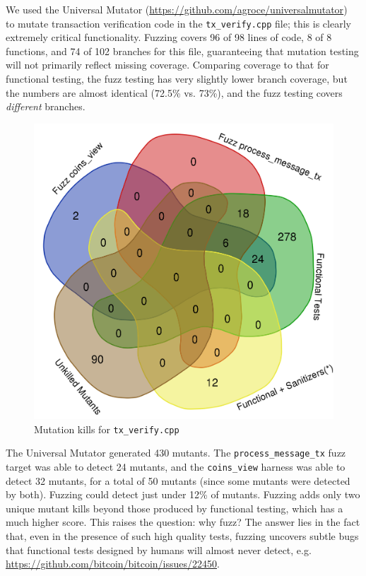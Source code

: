 \begin{sloppypar}
We used the Universal Mutator
\noindent(\url{https://github.com/agroce/universalmutator})~\cite{regexpMut} to
mutate transaction
verification code  in the
{\tt tx\_verify.cpp} file; this is clearly extremely critical functionality.  Fuzzing covers 96 of 98 lines of code, 8
of 8 functions, and 74 of 102 branches for this file, guaranteeing
that mutation testing will not primarily reflect missing coverage.
Comparing coverage to that for functional testing, the fuzz testing
has very slightly lower branch coverage, but the numbers are almost
identical (72.5\% vs. 73\%), and the fuzz testing covers \emph{different} branches.  

\begin{figure}
\vspace{2mm}
\includegraphics[width=0.6\columnwidth]{kill_pre_valgrind.png}
\caption{Mutation kills for {\tt tx\_verify.cpp}}
\label{kills}
\end{figure}






The Universal Mutator generated 430 mutants. The {\tt process\_message\_tx} fuzz target was
able to detect 24 mutants, and the {\tt coins\_view} harness was able to detect
32 mutants, for a total of 50 mutants (since some mutants were
detected by both). Fuzzing could detect just under 12\%
of mutants.   Fuzzing adds only two unique mutant kills beyond those produced by
functional testing, which has a much higher score.  This raises the question:  why fuzz?  
The answer lies in the fact that, even in the presence of such high quality tests, fuzzing
uncovers subtle bugs that functional tests designed by humans will
almost never detect, e.g. \url{https://github.com/bitcoin/bitcoin/issues/22450}.


\end{sloppypar}
